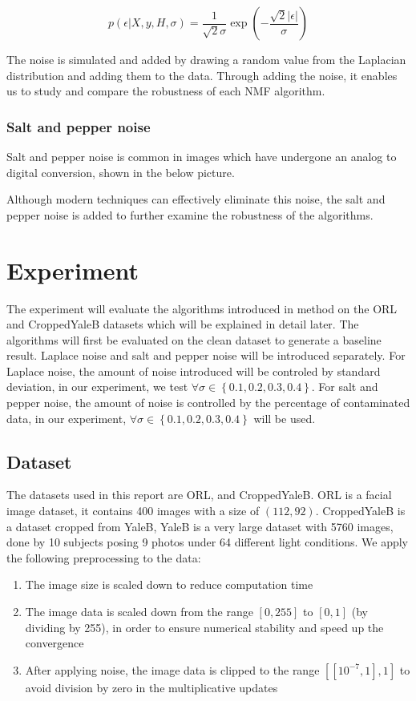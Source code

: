 \documentclass{article} %
\begin{document}
\begin{equation}
p \left ( \epsilon | X,y,H,\sigma \right ) = \frac{1}{\sqrt{2}\sigma} \exp \left ( -\frac{\sqrt{2}\left | \epsilon  \right |}{\sigma} \right )
\end{equation}

The noise is simulated and added by drawing a random value from the Laplacian distribution and adding them to the data. Through adding the noise, it enables us to study and compare the robustness of each NMF algorithm.

\subsubsection{Salt and pepper noise}
Salt and pepper noise is common in images which have undergone an analog to digital conversion, shown in the below picture.

Although modern techniques can effectively eliminate this noise, the salt and pepper noise is added to further examine the robustness of the algorithms.

\section{Experiment}
The experiment will evaluate the algorithms introduced in method on the ORL and CroppedYaleB datasets which will be explained in detail later. The algorithms will first be evaluated on the clean dataset to generate a baseline result. Laplace noise and salt and pepper noise will be introduced separately. For Laplace noise, the amount of noise introduced will be controled by standard deviation, in our experiment, we test $\forall \sigma \in  \left \{ 0.1,0.2,0.3,0.4 \right \}$. For salt and pepper noise, the amount of noise is controlled by the percentage of contaminated data, in our experiment, $\forall \sigma \in  \left \{ 0.1,0.2,0.3,0.4 \right \}$ will be used.

\subsection{Dataset}
The datasets used in this report are ORL, and CroppedYaleB. ORL is a facial image dataset, it contains 400 images with a size of $\left(112,92\right)$. CroppedYaleB is a dataset cropped from YaleB, YaleB is a very large dataset with 5760 images, done by 10 subjects posing 9 photos under 64 different light conditions. We apply the following preprocessing to the data:

\begin{enumerate}
\item The image size is scaled down to reduce computation time
\item The image data is scaled down from the range $\left [ 0,255 \right ]$ to $\left [ 0,1 \right ]$ (by dividing by 255), in order to ensure numerical stability and speed up the convergence
\item After applying noise, the image data is clipped to the range $\left [ \left [ 10^{-7},1 \right ],1 \right ]$ to avoid division by zero in the multiplicative updates
\end{enumerate}
\end{document}
